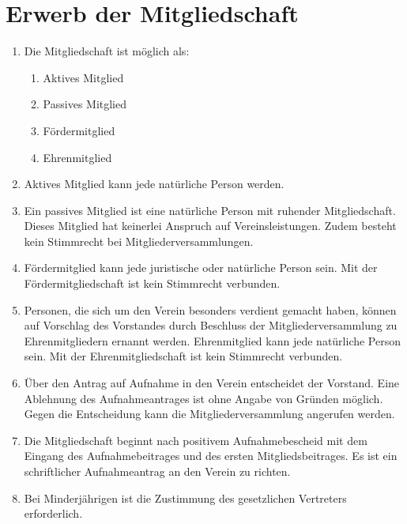 \documentclass[a4paper,ngerman]{scrartcl}
\begin{document}
\section{Erwerb der Mitgliedschaft}
\begin{enumerate}
\item Die Mitgliedschaft ist möglich als: 
\begin{enumerate}
\item Aktives Mitglied
\item Passives Mitglied
\item Fördermitglied
\item Ehrenmitglied
\end{enumerate}
\item Aktives Mitglied kann jede natürliche Person werden. 
\item Ein passives Mitglied ist eine natürliche Person mit ruhender Mitgliedschaft. Dieses Mitglied hat keinerlei Anspruch auf Vereinsleistungen. Zudem besteht kein Stimmrecht bei Mitgliederversammlungen.\label{passive Mitgliedschaft}
\item Fördermitglied kann jede juristische oder natürliche Person sein. Mit der Fördermitgliedschaft ist kein Stimmrecht verbunden.
\item 
Personen, die sich um den Verein besonders verdient gemacht haben, können auf Vorschlag des Vorstandes durch Beschluss der Mitgliederversammlung zu Ehrenmitgliedern ernannt werden.
Ehrenmitglied kann jede natürliche Person sein. Mit der Ehrenmitgliedschaft ist kein Stimmrecht verbunden.
\item Über den Antrag auf Aufnahme in den Verein entscheidet der Vorstand. Eine Ablehnung des Aufnahmeantrages ist ohne Angabe von Gründen möglich. Gegen die Entscheidung kann die Mitgliederversammlung angerufen werden.
\item Die Mitgliedschaft beginnt nach positivem Aufnahmebescheid mit dem Eingang des Aufnahmebeitrages und des ersten Mitgliedsbeitrages. Es ist ein schriftlicher Aufnahmeantrag an den Verein zu richten.
\item Bei Minderjährigen ist die Zustimmung des gesetzlichen Vertreters erforderlich.
\end{enumerate}
\end{document}
